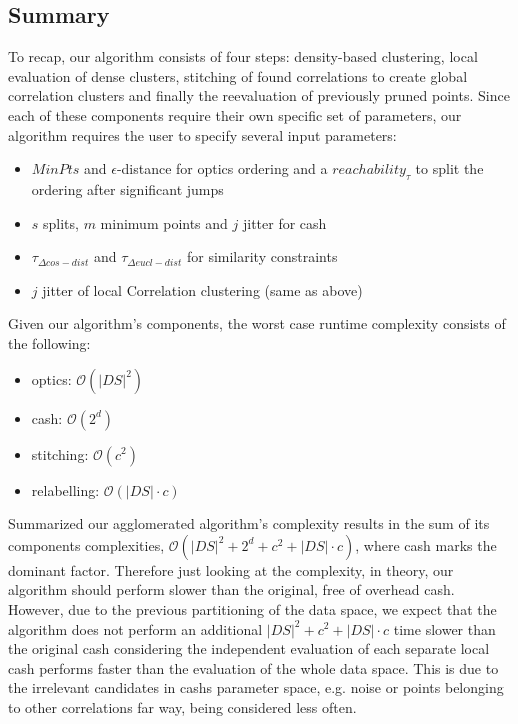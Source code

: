 \subsection{Summary}
To recap, our algorithm consists of four steps: density-based clustering, local evaluation of dense clusters, stitching of found correlations to create global correlation clusters and finally the reevaluation of previously pruned points. Since each of these components require their own specific set of parameters, our algorithm requires the user to specify several input parameters:
\begin{itemize}[label={\tiny\raisebox{1ex}{\textbullet}},topsep=6pt,itemsep=-1ex,partopsep=2ex,parsep=2ex]
    \item {} $MinPts$ and $\epsilon$-distance for \gls{optics} ordering and a $reachability_{\tau}$ to split the ordering after significant jumps
    \item {} $s$ splits, $m$ minimum points and $j$ jitter for \gls{cash}
    \item {} $\tau_{\Delta cos-dist}$ and $\tau_{\Delta eucl-dist}$ for similarity constraints
    \item {} $j$ jitter of local Correlation clustering (same as above)
\end{itemize}
Given our algorithm's components, the worst case runtime complexity consists of the following:
\begin{itemize}[label={\tiny\raisebox{1ex}{\textbullet}},topsep=6pt,itemsep=-1ex,partopsep=2ex,parsep=2ex]
    \item \gls{optics}: $\mathcal{O}(|DS|^2)$
    \item \gls{cash}: $\mathcal{O}(2^d)$
    \item stitching: $\mathcal{O}(c^2)$
    \item relabelling: $\mathcal{O}(|DS| \cdot c)$
\end{itemize}

Summarized our agglomerated algorithm's complexity results in the sum of its components complexities, $\mathcal{O}(|DS|^2+2^d+c^2+|DS|\cdot c)$, where \gls{cash} marks the dominant factor.
Therefore just looking at the complexity, in theory, our algorithm should perform slower than the original, free of overhead \gls{cash}. However, due to the previous partitioning of the data space, we expect that the algorithm does not perform an additional $|DS|^2+c^2+|DS|\cdot c$ time slower than the original \gls{cash} considering the independent evaluation of each separate local \gls{cash} performs faster than the evaluation of the whole data space. This is due to the irrelevant candidates in \gls{cash}s parameter space, e.g. noise or points belonging to other correlations far way, being considered less often.

